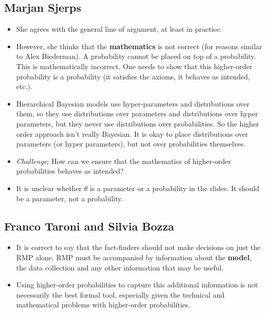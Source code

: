 \documentclass[
  10pt,
  dvipsnames,enabledeprecatedfontcommands]{scrartcl}
\begin{document}
\hypertarget{marjan-sjerps}{%
\subsection{Marjan Sjerps}\label{marjan-sjerps}}

\begin{itemize}
\item
  She agrees with the general line of argument, at least in practice.
\item
  However, she thinks that the \textbf{mathematics} is not correct (for
  reasons similar to Alex Biederman). A probability cannot be placed on
  top of a probability. This is mathematically incorrect. One needs to
  show that this higher-order probability is a probability (it satisfies
  the axioms, it behaves as intended, etc.).
\item
  Hierarchical Bayesian models use hyper-parameters and distributions
  over them, so they use distributions over parameters and distributions
  over hyper parameters, but they never use distributions over
  probabilities. So the higher order approach isn't really Bayesian. It
  is okay to place distributions over parameters (or hyper parameters),
  but not over probabilities themselves.
\item
  \emph{Challenge}: How can we ensure that the mathematics of
  higher-order probabilities behaves as intended?
\item
  It is unclear whether \(\theta\) is a parameter or a probability in
  the slides. It should be a parameter, not a probability.
\end{itemize}

\hypertarget{franco-taroni-and-silvia-bozza}{%
\subsection{Franco Taroni and Silvia
Bozza}\label{franco-taroni-and-silvia-bozza}}

\begin{itemize}
\item
  It is correct to say that the fact-finders should not make decisions
  on just the RMP alone. RMP must be accompanied by information about
  the \textbf{model}, the data collection and any other information that
  may be useful.
\item
  Using higher-order probabilities to capture this additional
  information is not necessarily the best formal tool, especially given
  the technical and mathematical problems with higher-order
  probabilities.
\end{itemize}
\end{document}
